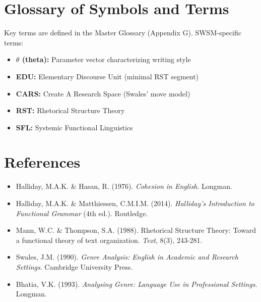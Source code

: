 
\section{Glossary of Symbols and Terms}
\label{sec:sw-glossary}

Key terms are defined in the Master Glossary (Appendix G). SWSM-specific terms:

\begin{itemize}
    \item \textbf{$\theta$ (theta):} Parameter vector characterizing writing style
    \item \textbf{EDU:} Elementary Discourse Unit (minimal RST segment)
    \item \textbf{CARS:} Create A Research Space (Swales' move model)
    \item \textbf{RST:} Rhetorical Structure Theory
    \item \textbf{SFL:} Systemic Functional Linguistics
\end{itemize}


\section{References}
\label{sec:sw-references}

\nocite{bcm_master}

\begin{itemize}
    \item Halliday, M.A.K. \& Hasan, R. (1976). \textit{Cohesion in English}. Longman.
    \item Halliday, M.A.K. \& Matthiessen, C.M.I.M. (2014). \textit{Halliday's Introduction to Functional Grammar} (4th ed.). Routledge.
    \item Mann, W.C. \& Thompson, S.A. (1988). Rhetorical Structure Theory: Toward a functional theory of text organization. \textit{Text}, 8(3), 243-281.
    \item Swales, J.M. (1990). \textit{Genre Analysis: English in Academic and Research Settings}. Cambridge University Press.
    \item Bhatia, V.K. (1993). \textit{Analysing Genre: Language Use in Professional Settings}. Longman.
\end{itemize}



